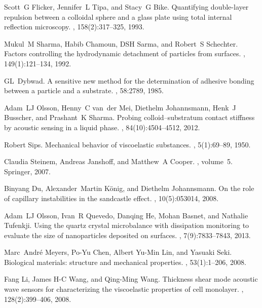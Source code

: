 \documentclass[floatfix,superscriptaddress,a4paper,twocolumn]{revtex4-1}
\begin{document}
\begin{thebibliography}{10}
Scott~G Flicker, Jennifer~L Tipa, and Stacy~G Bike.
\newblock Quantifying double-layer repulsion between a colloidal sphere and a
  glass plate using total internal reflection microscopy.
, 158(2):317--325,
  1993.

Mukul~M Sharma, Habib Chamoun, DSH Sarma, and Robert~S Schechter.
\newblock Factors controlling the hydrodynamic detachment of particles from
  surfaces.
, 149(1):121--134,
  1992.

GL~Dybwad.
\newblock A sensitive new method for the determination of adhesive bonding
  between a particle and a substrate.
, 58:2789, 1985.

Adam~LJ Olsson, Henny~C van~der Mei, Diethelm Johannsmann, Henk~J Busscher, and
  Prashant~K Sharma.
\newblock Probing colloid--substratum contact stiffness by acoustic sensing in
  a liquid phase.
, 84(10):4504--4512, 2012.

Robert Sips.
\newblock Mechanical behavior of viscoelastic substances.
, 5(1):69--89, 1950.

Claudia Steinem, Andreas Janshoff, and Matthew~A Cooper.
, volume~5.
\newblock Springer, 2007.

Binyang Du, Alexander~Martin K{\"o}nig, and Diethelm Johannsmann.
\newblock On the role of capillary instabilities in the sandcastle effect.
, 10(5):053014, 2008.

Adam~LJ Olsson, Ivan~R Quevedo, Danqing He, Mohan Basnet, and Nathalie
  Tufenkji.
\newblock Using the quartz crystal microbalance with dissipation monitoring to
  evaluate the size of nanoparticles deposited on surfaces.
, 7(9):7833--7843, 2013.

Marc~Andr{\'e} Meyers, Po-Yu Chen, Albert Yu-Min Lin, and Yasuaki Seki.
\newblock Biological materials: structure and mechanical properties.
, 53(1):1--206, 2008.

Fang Li, James H-C Wang, and Qing-Ming Wang.
\newblock Thickness shear mode acoustic wave sensors for characterizing the
  viscoelastic properties of cell monolayer.
, 128(2):399--406, 2008.


\end{thebibliography}
\end{document}
